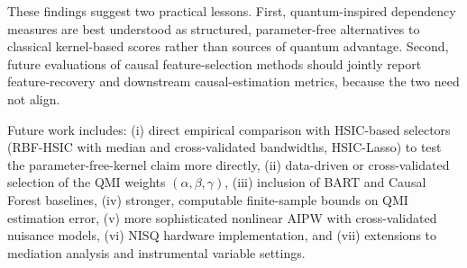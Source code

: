 \documentclass{svproc}
\begin{document}
These findings suggest two practical lessons. First, quantum-inspired dependency measures are best understood as structured, parameter-free alternatives to classical kernel-based scores rather than sources of quantum advantage. Second, future evaluations of causal feature-selection methods should jointly report feature-recovery and downstream causal-estimation metrics, because the two need not align.

Future work includes: (i) direct empirical comparison with HSIC-based selectors (RBF-HSIC with median and cross-validated bandwidths, HSIC-Lasso) to test the parameter-free-kernel claim more directly, (ii) data-driven or cross-validated selection of the QMI weights $(\alpha,\beta,\gamma)$, (iii) inclusion of BART and Causal Forest baselines, (iv) stronger, computable finite-sample bounds on QMI estimation error, (v) more sophisticated nonlinear AIPW with cross-validated nuisance models, (vi) NISQ hardware implementation, and (vii) extensions to mediation analysis and instrumental variable settings.
\end{document}
